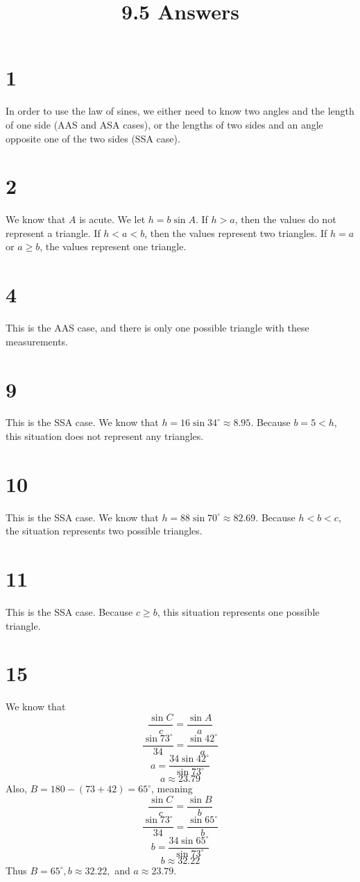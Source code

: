 \documentclass{article}
\title{9.5 Answers}
\theoremstyle{definition}
\newcommand{\?}{\stackrel{?}{=}}
\begin{document}
\maketitle

\section*{1}
In order to use the law of sines, we either need to know two angles and the length of one side (AAS and ASA cases), or the lengths of two sides and an angle opposite one of the two sides
(SSA case).

\section*{2}
We know that $A$ is acute. We let $h=b\sin A$. If $h>a$, then the values do not represent a triangle. If $h<a<b$, then the values represent two triangles. If $h=a$ or $a\ge b$, the values 
represent one triangle.

\section*{4}
This is the AAS case, and there is only one possible triangle with these measurements.

\section*{9}
This is the SSA case. We know that $h=16\sin 34^\circ\approx 8.95$. Because $b=5<h$, this situation does not represent any triangles.

\section*{10}
This is the SSA case. We know that $h=88\sin 70^\circ\approx 82.69$. Because $h<b<c$, the situation represents two possible triangles.

\section*{11}
This is the SSA case. Because $c\ge b$, this situation represents one possible triangle.

\section*{15}
We know that
\[ \frac{\sin C}{c}=\frac{\sin A}{a} \]
\[ \frac{\sin 73^\circ}{34}=\frac{\sin 42^\circ}{a} \]
\[ a=\dfrac{34\sin 42^\circ}{\sin 73^\circ} \]
\[ a\approx 23.79 \]
Also, $B=180-(73+42)=65^\circ$, meaning
\[ \frac{\sin C}{c}=\frac{\sin B}{b} \]
\[ \frac{\sin 73^\circ}{34}=\frac{\sin 65^\circ}{b} \]
\[ b=\frac{34\sin 65^\circ}{\sin 73^\circ} \]
\[ b\approx 32.22 \]
Thus $B=65^\circ,b\approx 32.22,$ and $a\approx 23.79$.
\end{document}
